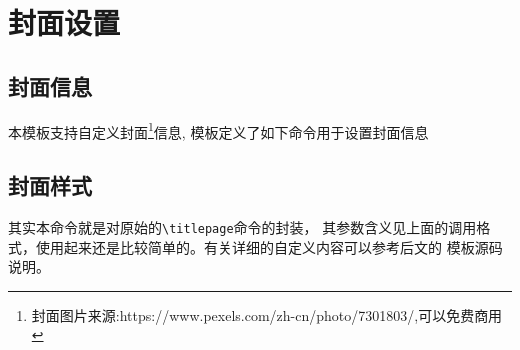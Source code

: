 \section{封面设置}
\subsection{封面信息}
本模板支持自定义封面\footnote[1]{封面图片来源:https://www.pexels.com/zh-cn/photo/7301803/,可以免费商用}信息,
模板定义了如下命令用于设置封面信息
\begin{bytes}
\end{bytes}

\subsection{封面样式}
其实本命令就是对原始的\texttt{\textbackslash titlepage}命令的封装，
其参数含义见上面的调用格式，使用起来还是比较简单的。有关详细的自定义内容可以参考后文的
模板源码说明。


